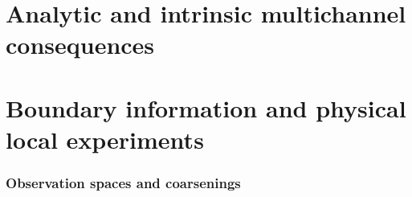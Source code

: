 \part{Analytic and intrinsic multichannel consequences}




















\part{Boundary information and physical local experiments}
\section{Observation spaces and coarsenings}
\label{sec:v49-record-spaces}























